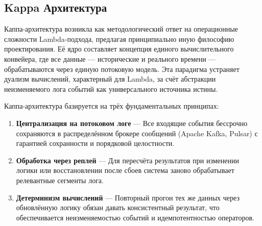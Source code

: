         \subsection{Kappa Архитектура}
            Каппа-архитектура возникла как методологический ответ на операционные сложности Lambda-подхода, предлагая принципиально иную философию проектирования. Её ядро составляет концепция единого вычислительного конвейера, где все данные — исторические и реального времени — обрабатываются через единую потоковую модель. Эта парадигма устраняет дуализм вычислений, характерный для Lambda, за счёт абстракции неизменяемого лога событий как универсального источника истины.

            
            Каппа-архитектура базируется на трёх фундаментальных принципах:
            \begin{enumerate}
                \item \textbf{Централизация на потоковом логе} — Все входящие события бессрочно сохраняются в распределённом брокере сообщений (Apache Kafka, Pulsar) с гарантией сохранности и порядковой целостности.
                \item \textbf{Обработка через реплей} — Для пересчёта результатов при изменении логики или восстановлении после сбоев система заново обрабатывает релевантные сегменты лога.
                \item \textbf{Детерминизм вычислений} — Повторный прогон тех же данных через обновлённую логику обязан давать консистентный результат, что обеспечивается неизменяемостью событий и идемпотентностью операторов.
            \end{enumerate}

